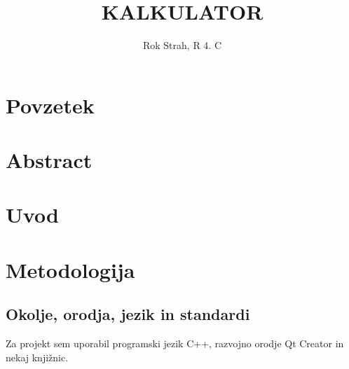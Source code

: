 \documentclass[12pt,titlepage]{report}
\title{KALKULATOR}
\author{Rok Strah, R 4. C}
\begin{document}
\maketitle

\chapter*{Povzetek}
\chapter*{Abstract}
\thispagestyle{empty}


{\begin{spacing}{1.15}
\pagestyle{empty}
\clearpage
\tableofcontents
\clearpage
\listoffigures
\pagestyle{plain}
\end{spacing}}
\thispagestyle{empty}
\clearpage
\setcounter{page}{1}

\chapter{Uvod}
\label{intro}

\chapter{Metodologija}
\label{methods}
	\section{Okolje, orodja, jezik in standardi}
		Za projekt sem uporabil programski jezik C++, razvojno orodje Qt Creator in nekaj knjižnic.
\end{document}

